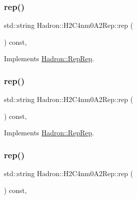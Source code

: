 \subsubsection{\texorpdfstring{rep()}{rep()}\hspace{0.1cm}{\footnotesize\ttfamily [1/3]}}
{\footnotesize\ttfamily std\+::string Hadron\+::\+H2\+C4nm0\+A2\+Rep\+::rep (\begin{DoxyParamCaption}{ }\end{DoxyParamCaption}) const\hspace{0.3cm}{\ttfamily [inline]}, {\ttfamily [virtual]}}



Implements \mbox{\hyperlink{structHadron_1_1RepRep_ab3213025f6de249f7095892109575fde}{Hadron\+::\+Rep\+Rep}}.

\mbox{\label{structHadron_1_1H2C4nm0A2Rep_acf769194280e756693be59efab932c8d}} 
\subsubsection{\texorpdfstring{rep()}{rep()}\hspace{0.1cm}{\footnotesize\ttfamily [2/3]}}
{\footnotesize\ttfamily std\+::string Hadron\+::\+H2\+C4nm0\+A2\+Rep\+::rep (\begin{DoxyParamCaption}{ }\end{DoxyParamCaption}) const\hspace{0.3cm}{\ttfamily [inline]}, {\ttfamily [virtual]}}



Implements \mbox{\hyperlink{structHadron_1_1RepRep_ab3213025f6de249f7095892109575fde}{Hadron\+::\+Rep\+Rep}}.

\mbox{\label{structHadron_1_1H2C4nm0A2Rep_acf769194280e756693be59efab932c8d}} 
\subsubsection{\texorpdfstring{rep()}{rep()}\hspace{0.1cm}{\footnotesize\ttfamily [3/3]}}
{\footnotesize\ttfamily std\+::string Hadron\+::\+H2\+C4nm0\+A2\+Rep\+::rep (\begin{DoxyParamCaption}{ }\end{DoxyParamCaption}) const\hspace{0.3cm}{\ttfamily [inline]}, {\ttfamily [virtual]}}



